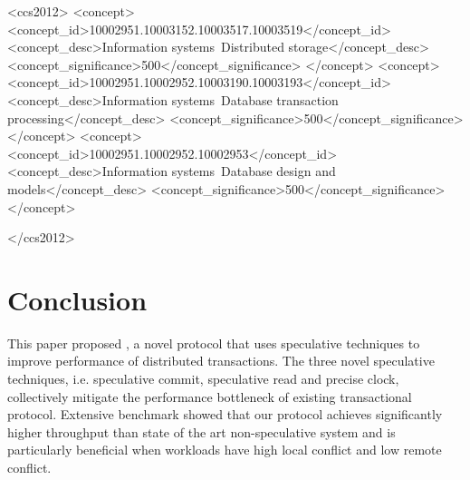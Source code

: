 \documentclass{sig-alternate-05-2015}
\begin{document}
%
%
\begin{CCSXML}
<ccs2012>
<concept>
	<concept_id>10002951.10003152.10003517.10003519</concept_id>
	<concept_desc>Information systems~Distributed storage</concept_desc>
	<concept_significance>500</concept_significance>
</concept>
<concept>
	<concept_id>10002951.10002952.10003190.10003193</concept_id>
	<concept_desc>Information systems~Database transaction processing</concept_desc>
	<concept_significance>500</concept_significance>
</concept>
<concept>
	<concept_id>10002951.10002952.10002953</concept_id>
	<concept_desc>Information systems~Database design and models</concept_desc>
	<concept_significance>500</concept_significance>
</concept>

</ccs2012> 
\end{CCSXML}



%
%

%
%
\printccsdesc




\section{Conclusion}
This paper proposed {\specula}, a novel protocol that uses speculative techniques to improve performance of distributed transactions. The three novel speculative techniques, i.e. speculative commit, speculative read and precise clock, collectively mitigate the performance bottleneck of existing transactional protocol. Extensive benchmark showed that our protocol achieves significantly higher throughput than state of the art non-speculative system and is particularly beneficial when workloads have high local conflict and low remote conflict.




\end{document}
